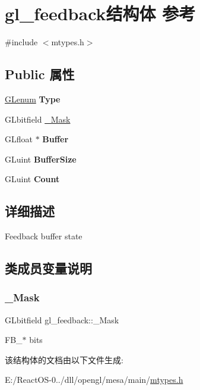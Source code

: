 \hypertarget{structgl__feedback}{}\section{gl\+\_\+feedback结构体 参考}
\label{structgl__feedback}


{\ttfamily \#include $<$mtypes.\+h$>$}

\subsection*{Public 属性}
\begin{DoxyCompactItemize}
\item 
\mbox{\label{structgl__feedback_a26b05abc6ee88208279b2199a16ce846}} 
\hyperlink{interfacevoid}{G\+Lenum} {\bfseries Type}
\item 
G\+Lbitfield \hyperlink{structgl__feedback_a8b784ce411a01f8a32a5b909e61c250d}{\+\_\+\+Mask}
\item 
\mbox{\label{structgl__feedback_a385d00e0fe64577f3982b6e3842b8b1c}} 
G\+Lfloat $\ast$ {\bfseries Buffer}
\item 
\mbox{\label{structgl__feedback_a0035cd4c02149111a1d292504db0fd79}} 
G\+Luint {\bfseries Buffer\+Size}
\item 
\mbox{\label{structgl__feedback_a5525f0b9fb4bf53d36b4bf5689e41d09}} 
G\+Luint {\bfseries Count}
\end{DoxyCompactItemize}


\subsection{详细描述}
Feedback buffer state 

\subsection{类成员变量说明}
\mbox{\label{structgl__feedback_a8b784ce411a01f8a32a5b909e61c250d}} 
\subsubsection{\texorpdfstring{\+\_\+\+Mask}{\_Mask}}
{\footnotesize\ttfamily G\+Lbitfield gl\+\_\+feedback\+::\+\_\+\+Mask}

F\+B\+\_\+$\ast$ bits 

该结构体的文档由以下文件生成\+:\begin{DoxyCompactItemize}
\item 
E\+:/\+React\+O\+S-\/0../dll/opengl/mesa/main/\hyperlink{mtypes_8h}{mtypes.\+h}\end{DoxyCompactItemize}
